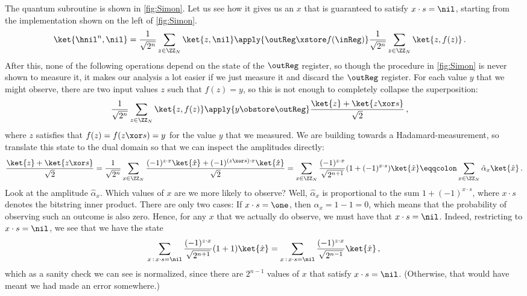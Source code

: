       The quantum subroutine is shown in \cref{fig:Simon}. Let us see how it
        gives us an $x$ that is guaranteed to satisfy $x \cdot s = \nil$,
        starting from
        the implementation shown on the left of \cref{fig:Simon}.
      \begin{align*}
        &\ket{\hnil^n, \nil} 
          = \frac{1}{\sqrt{2^n}} \sum_{z \in \ZZ_N} \ket{z, \nil} 
          \apply{\outReg \xstore f(\inReg)} 
          \frac{1}{\sqrt{2^n}} \sum_{z \in \ZZ_N} \ket{z, f(z)}\, .
      \end{align*}
      After this, none of the following operations depend on the state of the $\outReg$ register, 
      so though the procedure in \cref{fig:Simon} is never shown to measure it, it
      makes our analysis a lot easier if we just measure it and discard the
      $\outReg$ register. For each value $y$ that we might observe, there are
      two input values $z$ such that $f(z) = y$, so this is not enough to
      completely collapse the superposition:
      \begin{align*}
        \frac{1}{\sqrt{2^n}} \sum_{z \in \ZZ_N} \ket{z, f(z)}
        &\apply{y \obstore \outReg}
          \frac{
            \ket{z} + \ket{z \xor s}
          }{\sqrt{2}}\, ,
      \end{align*}
      where $z$ satisfies that $f(z) = f(z \xor s) = y$ for the value $y$ that
      we measured.
      We are building towards a Hadamard-measurement, so translate this state to
      the dual domain so that we can inspect the amplitudes directly:
      \[
          \frac{
            \ket{z} + \ket{z \xor s}
          }{\sqrt{2}}
          = \frac{1}{\sqrt{2^n}} \sum_{x \in \ZZ_N}
          \frac{
            (-1)^{z \cdot x}\ket{\hat x} + (-1)^{(z \xor s) \cdot x}\ket{\hat x}
          }{\sqrt{2}} 
          = \sum_{x \in \ZZ_N}
          \frac{
            (-1)^{z \cdot x}
          }{\sqrt{2^{n+1}}} (1 + (-1)^{x \cdot s}) \ket{\hat x} 
          \eqqcolon \sum_{x \in \ZZ_N} \hat{\alpha}_{x} \ket{\hat x}\, .
      \]
      Look at the amplitude $\hat{\alpha}_x$. Which values of $x$ are we more 
      likely to observe? Well, $\hat{\alpha}_x$ is proportional to the sum $1 +
      (-1)^{x \cdot s}$, where $x \cdot s$ denotes the bitstring inner product.
      There are only two cases: If $x \cdot s = \one$, then $\hat{\alpha}_x = 1-1 = 0$, which means
      that the probability of observing such an outcome is also zero.
      Hence, for any $x$ that we actually do observe, we must have that $x \cdot s =
      \nil$. Indeed, restricting to $x \cdot s = \nil$, we see that we have the state
      \[
        \sum_{x\, :\, x \cdot s = \nil}
        \frac{
          (-1)^{z \cdot x}
        }{\sqrt{2^{n+1}}} (1 + 1) \ket{\hat x}
        = \sum_{x\, :\, x \cdot s = \nil}
        \frac{
          (-1)^{z \cdot x}
        }{\sqrt{2^{n-1}}} \ket{\hat x}\, ,
      \]
      which as a sanity check we can see is normalized, since there are
      $2^{n-1}$ values of $x$ %
      that satisfy $x \cdot s = \nil$. (Otherwise, that would have meant we had
      made an error somewhere.)

